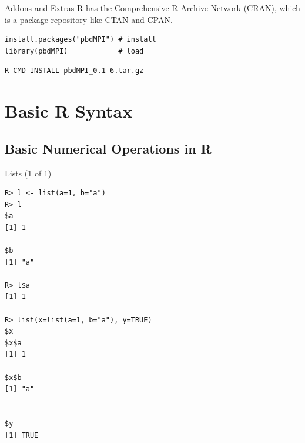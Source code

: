 \begin{frame}[fragile]
  \begin{block}{Addons and Extras}\pause
  R has the Comprehensive R Archive Network (CRAN), which is a package 
repository like CTAN and CPAN.
  \begin{lstlisting}[title=From R]
install.packages("pbdMPI") # install
library(pbdMPI)            # load
\end{lstlisting}

\begin{lstlisting}[title=From   
Shell,backgroundcolor=\color{white},basicstyle=\ttfamily\color{black}\scriptsize
,keywordstyle=\color{black}, 
  commentstyle=\color{black},stringstyle=\color{black}]
R CMD INSTALL pbdMPI_0.1-6.tar.gz
\end{lstlisting}
\end{block}
\end{frame}





\section{Basic R Syntax}


\subsection{Basic Numerical Operations in R}

\begin{frame}
  \begin{exampleblock}{Lists (1 of 1)}\pause
  
\begin{lstlisting}[backgroundcolor=\color{white},basicstyle=\ttfamily\color{
dkgray}\scriptsize,keywordstyle=\color{black}, 
  commentstyle=\color{orange},stringstyle=\color{mauve}]
R> l <- list(a=1, b="a")
R> l
$a
[1] 1

$b
[1] "a"

R> l$a
[1] 1

R> list(x=list(a=1, b="a"), y=TRUE)
$x
$x$a
[1] 1

$x$b
[1] "a"


$y
[1] TRUE
\end{lstlisting}
  \end{exampleblock}
\end{frame}



